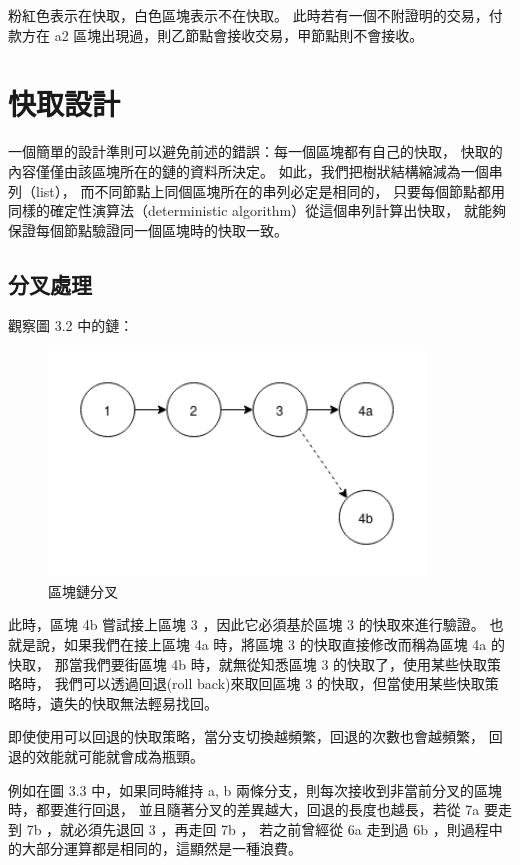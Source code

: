粉紅色表示在快取，白色區塊表示不在快取。
此時若有一個不附證明的交易，付款方在 a2 區塊出現過，則乙節點會接收交易，甲節點則不會接收。

\section{快取設計}

一個簡單的設計準則可以避免前述的錯誤：每一個區塊都有自己的快取，
快取的內容僅僅由該區塊所在的鏈的資料所決定。
如此，我們把樹狀結構縮減為一個串列（list），
而不同節點上同個區塊所在的串列必定是相同的，
只要每個節點都用同樣的確定性演算法（deterministic algorithm）從這個串列計算出快取，
就能夠保證每個節點驗證同一個區塊時的快取一致。

\subsection{分叉處理}

觀察圖 3.2 中的鏈：

\begin{figure}[h!]
\includegraphics[width=10cm]{快取分叉}
\caption{區塊鏈分叉}
\end{figure}

此時，區塊 4b 嘗試接上區塊 3 ，因此它必須基於區塊 3 的快取來進行驗證。
也就是說，如果我們在接上區塊 4a 時，將區塊 3 的快取直接修改而稱為區塊 4a 的快取，
那當我們要街區塊 4b 時，就無從知悉區塊 3 的快取了，使用某些快取策略時，
我們可以透過回退(roll back)來取回區塊 3 的快取，但當使用某些快取策略時，遺失的快取無法輕易找回。

即使使用可以回退的快取策略，當分支切換越頻繁，回退的次數也會越頻繁，
回退的效能就可能就會成為瓶頸。

例如在圖 3.3 中，如果同時維持 a, b 兩條分支，則每次接收到非當前分叉的區塊時，都要進行回退，
並且隨著分叉的差異越大，回退的長度也越長，若從 7a 要走到 7b ，就必須先退回 3 ，再走回 7b ，
若之前曾經從 6a 走到過 6b ，則過程中的大部分運算都是相同的，這顯然是一種浪費。

